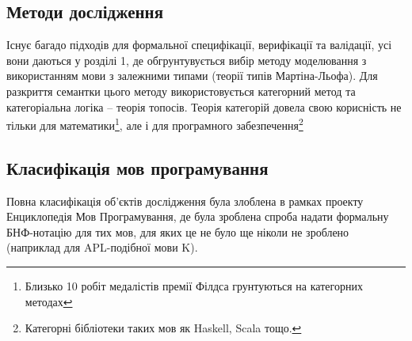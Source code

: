\subsection{Методи дослідження}
Існує багадо підходів для формальної специфікації,
верифікації та валідації, усі вони даються у розділі 1, де
обгрунтувується вибір методу моделювання з використанням
мови з залежними типами (теорії типів Мартіна-Льофа).
Для разкриття семантки цього методу використовується
категорний метод та категоріальна логіка -- теорія топосів.
Теорія категорій довела свою корисність не тільки для
математики\footnote{Близько 10 робіт медалістів премії
Філдса грунтуються на категорних методах},
але і для програмного
забезпечення\footnote{Категорні бібліотеки таких мов як Haskell, Scala тощо.}

\subsection{Класифікація мов програмування}
Повна класифікація об'єктів дослідження була злоблена в рамках проекту
Енциклопедія Мов Програмування, де була зроблена спроба надати
формальну БНФ-нотацію для тих мов, для яких це не було ще ніколи
не зроблено (наприклад для APL-подібної мови K).

